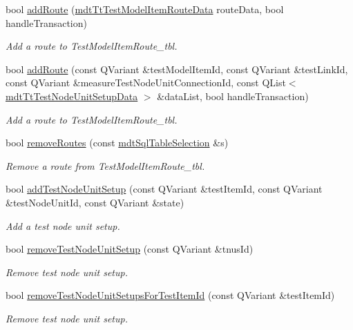 \begin{DoxyCompactItemize}
bool \hyperlink{classmdt_tt_test_model_item_a376af5a1f2c0778fcd14c9c78820b1c2}{add\-Route} (\hyperlink{classmdt_tt_test_model_item_route_data}{mdt\-Tt\-Test\-Model\-Item\-Route\-Data} route\-Data, bool handle\-Transaction)
\begin{DoxyCompactList}\small\item\em Add a route to Test\-Model\-Item\-Route\-\_\-tbl. \end{DoxyCompactList}\item 
bool \hyperlink{classmdt_tt_test_model_item_a6a65e1811e99e59bb9f531e643cbb329}{add\-Route} (const Q\-Variant \&test\-Model\-Item\-Id, const Q\-Variant \&test\-Link\-Id, const Q\-Variant \&measure\-Test\-Node\-Unit\-Connection\-Id, const Q\-List$<$ \hyperlink{classmdt_tt_test_node_unit_setup_data}{mdt\-Tt\-Test\-Node\-Unit\-Setup\-Data} $>$ \&data\-List, bool handle\-Transaction)
\begin{DoxyCompactList}\small\item\em Add a route to Test\-Model\-Item\-Route\-\_\-tbl. \end{DoxyCompactList}\item 
bool \hyperlink{classmdt_tt_test_model_item_acb07969d5c19a22d8f3039f5f8c2010b}{remove\-Routes} (const \hyperlink{classmdt_sql_table_selection}{mdt\-Sql\-Table\-Selection} \&s)
\begin{DoxyCompactList}\small\item\em Remove a route from Test\-Model\-Item\-Route\-\_\-tbl. \end{DoxyCompactList}\item 
bool \hyperlink{classmdt_tt_test_model_item_acac991609d4e4b39404cf1be14928947}{add\-Test\-Node\-Unit\-Setup} (const Q\-Variant \&test\-Item\-Id, const Q\-Variant \&test\-Node\-Unit\-Id, const Q\-Variant \&state)
\begin{DoxyCompactList}\small\item\em Add a test node unit setup. \end{DoxyCompactList}\item 
bool \hyperlink{classmdt_tt_test_model_item_a6424038eadcf2e2d11ee5aa269b562c7}{remove\-Test\-Node\-Unit\-Setup} (const Q\-Variant \&tnus\-Id)
\begin{DoxyCompactList}\small\item\em Remove test node unit setup. \end{DoxyCompactList}\item 
bool \hyperlink{classmdt_tt_test_model_item_ac45849becd11e9206b2d696e0346ba71}{remove\-Test\-Node\-Unit\-Setups\-For\-Test\-Item\-Id} (const Q\-Variant \&test\-Item\-Id)
\begin{DoxyCompactList}\small\item\em Remove test node unit setup. \end{DoxyCompactList}\end{DoxyCompactItemize}
